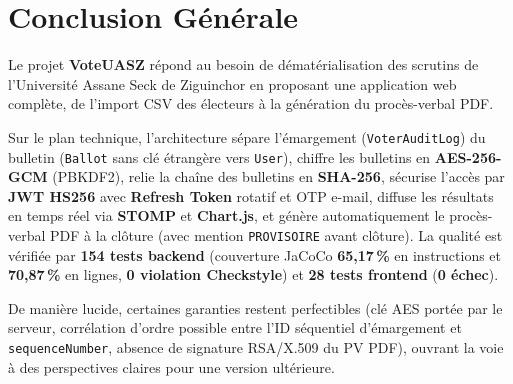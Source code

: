 \chapter*{Conclusion Générale}

Le projet \textbf{VoteUASZ} répond au besoin de dématérialisation des scrutins de l'Université Assane Seck de Ziguinchor en proposant une application web complète, de l'import CSV des électeurs à la génération du procès-verbal PDF.

Sur le plan technique, l'architecture sépare l'émargement (\texttt{VoterAuditLog}) du bulletin (\texttt{Ballot} sans clé étrangère vers \texttt{User}), chiffre les bulletins en \textbf{AES-256-GCM} (PBKDF2), relie la chaîne des bulletins en \textbf{SHA-256}, sécurise l'accès par \textbf{JWT HS256} avec \textbf{Refresh Token} rotatif et OTP e-mail, diffuse les résultats en temps réel via \textbf{STOMP} et \textbf{Chart.js}, et génère automatiquement le procès-verbal PDF à la clôture (avec mention \texttt{PROVISOIRE} avant clôture). La qualité est vérifiée par \textbf{154 tests backend} (couverture JaCoCo \textbf{65,17\,\%} en instructions et \textbf{70,87\,\%} en lignes, \textbf{0 violation Checkstyle}) et \textbf{28 tests frontend} (\textbf{0 échec}).

De manière lucide, certaines garanties restent perfectibles (clé AES portée par le serveur, corrélation d'ordre possible entre l'ID séquentiel d'émargement et \texttt{sequenceNumber}, absence de signature RSA/X.509 du PV PDF), ouvrant la voie à des perspectives claires pour une version ultérieure.

